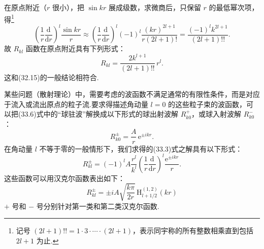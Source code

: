 在原点附近（$r$ 很小），把 $\sin kr$ 展成级数，求微商后，只保留 $r$ 的最低幂次项，得\footnote{记号 $(2l+1)!!=1\cdot3\cdot\cdots\cdot(2l+1)$，表示同宇称的所有整数相乘直到包括 $2l+1$ 为止.}
\begin{equation*}
  \left(\frac{1}{r}\frac{\mathrm{d}}{\mathrm{d}r}\right)^l\frac{\sin kr}{r}
  \approx\left(\frac{1}{r}\frac{\mathrm{d}}{\mathrm{d}r}\right)^l(-1)^l
  \frac{(kr)^{2l+1}}{r(2l+1)!}
  =\frac{(-1)^lk^{2l+1}}{(2l+1)!!}.
\end{equation*}
故 $R_{kl}$ 函数在原点附近具有下列形式：
\begin{equation}
  R_{kl}=\frac{2k^{l+1}}{(2l+1)!!}\,r^l.
\end{equation}
这和(32.15)的一般结论相符合.

某些问题（散射理论）中，需要考虑的波函数不满足通常的有限性条件，而是对应于流入或流出原点的粒子流.要求得描述角动量 $l=0$ 的这些粒子束的波函数，可以把(33.6)式中的“球驻波”解换成以下形式的球出射波解 $R^+_{k0}$，或球入射波解 $R^-_{k0}$：
\begin{equation}
  R^{\pm}_{k0}=\frac{A}{r}\,\mathrm{e}^{\pm ikr}.
\end{equation}
在角动量 $l$ 不等于零的一般情形下，我们求得的(33.3)式之解具有以下形式：
\begin{equation}
  R^{\pm}_{kl}=(-1)^lA\frac{r^l}{k^l}
  \left(\frac{1}{r}\frac{\mathrm{d}}{\mathrm{d}r}\right)^l\frac{\mathrm{e}^{\pm ikr}}{r}.
\end{equation}
这些函数可以用汉克尔函数表出如下：
\begin{equation}
  R^{\pm}_{kl}=\pm iA\sqrt{\frac{k\pi}{2r}}\,\mathrm{H}^{(1,2)}_{l+1/2}(kr)
\end{equation}
$+$ 号和 $-$ 号分别针对第一类和第二类汉克尔函数.

